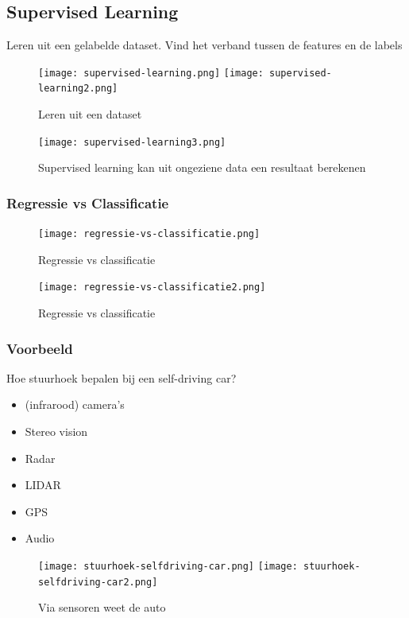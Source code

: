 \documentclass{article}
\begin{document}
\subsection{Supervised Learning}

Leren uit een gelabelde dataset. Vind het verband tussen de features en de labels

\begin{figure}[H]
    \centering
    \texttt{[image: supervised-learning.png]}
    \texttt{[image: supervised-learning2.png]}
    \caption{Leren uit een dataset}
\end{figure}

\begin{figure}[H]
    \centering
    \texttt{[image: supervised-learning3.png]}
    \caption{Supervised learning kan uit ongeziene data een resultaat berekenen}
\end{figure}

\subsubsection{Regressie vs Classificatie}

\begin{figure}[H]
    \centering
    \texttt{[image: regressie-vs-classificatie.png]}
    \caption{Regressie vs classificatie}
\end{figure}

\begin{figure}[H]
    \centering
    \texttt{[image: regressie-vs-classificatie2.png]}
    \caption{Regressie vs classificatie}
\end{figure}

\subsubsection{Voorbeeld}

Hoe stuurhoek bepalen bij een self-driving car?

\begin{itemize}
    \item (infrarood) camera's
    \item Stereo vision
    \item Radar
    \item LIDAR
    \item GPS
    \item Audio
\end{itemize}

\begin{figure}[H]
    \centering
    \texttt{[image: stuurhoek-selfdriving-car.png]}
    \texttt{[image: stuurhoek-selfdriving-car2.png]}
    \caption{Via sensoren weet de auto }
\end{figure}
\end{document}
